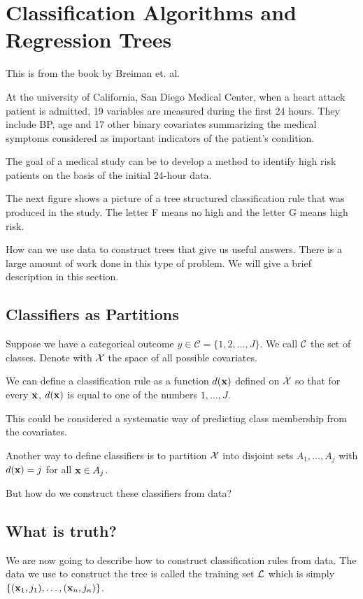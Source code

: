 \newpage
\section{Classification Algorithms and Regression Trees}
This is from the book by Breiman et. al.

At the university of California, San Diego Medical Center, when a
heart attack patient is admitted, 19 variables are measured during the
first 24 hours. They include BP, age and 17 other binary covariates
summarizing the medical symptoms considered as important indicators of
the patient's condition.

The goal of a medical study can be to develop a method to identify
high risk patients on the basis of the initial 24-hour data.

The next figure shows  a picture of a tree structured classification
rule that was produced in the study. The letter F means no high and
the letter G means high risk.

\centerline{}

How can we use data to construct trees that give us useful
answers. There is a large amount of work done in this type of problem.
We will give a brief description in this section.

\subsection{Classifiers as Partitions}
Suppose we have a categorical outcome
$y \in \mathcal{C} = \{1, 2, \ldots, J\}$. We call ${\cal C}$ the set
of classes. Denote  with ${\cal X}$ the space 
of all possible covariates.

We can define a classification rule as a function $d({\mathbf x})$ defined on
${\cal X}$ so that for every ${\mathbf x}$, $d({\mathbf x})$ is equal to one of the numbers
$1,\dots,J$. 

This could be considered a systematic way of predicting class
membership from the covariates.

Another way to define classifiers is to partition  ${\cal X}$
into disjoint sets $A_1,\dots,A_j$ with $d({\mathbf x})=j$ for all ${\mathbf x} \in A_j$.

But how do we construct these classifiers from data? 

\subsection{What is truth?}
We are now going to describe how to construct classification rules
from data. The 
data we use to construct the tree is called the training set $\cal L$
which is simply $\{ ({\mathbf x}_1,j_1),\dots,({\mathbf x}_n,j_n) \}$.

